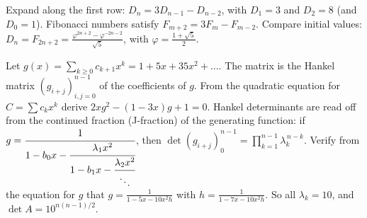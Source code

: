 \documentclass[11pt,a4paper]{article}
\begin{document}
Expand along the first row: \(D_n=3D_{n-1}-D_{n-2}\), with \(D_1=3\) and \(D_2=8\) (and \(D_0=1\)).
Fibonacci numbers satisfy \(F_{m+2}=3F_m-F_{m-2}\). Compare initial values: \(D_n=F_{2n+2}=\frac{\varphi^{2n+2}-\varphi^{-2n-2}}{\sqrt5}\), with \(\varphi=\frac{1+\sqrt5}2\).

Let \(g(x)=\sum_{k\ge0}c_{k+1}x^k=1+5x+35x^2+\dots\). The matrix is the Hankel matrix \((g_{i+j})_{i,j=0}^{n-1}\) of the coefficients of \(g\). From the quadratic equation for \(C=\sum c_kx^k\) derive \(2xg^2-(1-3x)g+1=0\).
Hankel determinants are read off from the continued fraction (J-fraction) of the generating function: if \(g=\cfrac{1}{1-b_0x-\cfrac{\lambda_1x^2}{1-b_1x-\cfrac{\lambda_2x^2}{\ddots}}}\), then \(\det(g_{i+j})_{0}^{n-1}=\prod_{k=1}^{n-1}\lambda_k^{\,n-k}\).
Verify from the equation for \(g\) that \(g=\frac{1}{1-5x-10x^2h}\) with \(h=\frac{1}{1-7x-10x^2h}\). So all \(\lambda_k=10\), and \(\det A=10^{n(n-1)/2}\).
\end{document}
